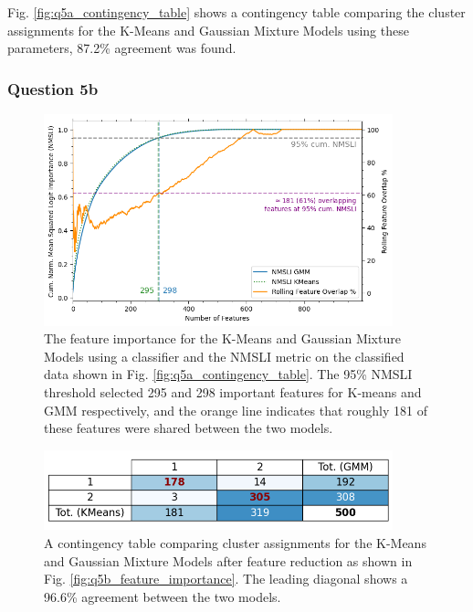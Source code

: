     Fig. \ref{fig:q5a_contingency_table} shows a contingency table comparing the cluster assignments for the K-Means and
    Gaussian Mixture Models using these parameters, 87.2\% agreement was found.

\subsubsection{Question 5b}\label{subsubsec:q5b}
    \begin{figure}[htb]
    \centering
    \includegraphics[width=0.9\textwidth]{./figures/q5b_feature_importance}
    \caption{The feature importance for the K-Means and Gaussian Mixture Models using a 
        classifier and the NMSLI metric on the classified data shown in Fig. \eqref{fig:q5a_contingency_table}.
        The 95\% NMSLI threshold selected 295 and 298 important features for K-means and GMM respectively, and the
        orange line indicates that roughly 181 of these features were shared between the two models.}
    \label{fig:q5b_feature_importance}
    \end{figure}

    \begin{figure}[htb]
    \centering
    \includegraphics[width=0.9\textwidth]{./figures/q5b_contingency_table}
    \caption{A contingency table comparing cluster assignments for the K-Means and Gaussian Mixture Models after feature
        reduction as shown in Fig. \eqref{fig:q5b_feature_importance}. The leading diagonal shows a 96.6\% agreement
        between the two models.}
    \label{fig:q5b_contingency_table}
    \end{figure}

